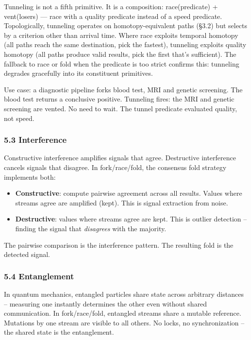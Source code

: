 \documentclass[
]{article}
\providecommand{\tightlist}{%
  \setlength{\itemsep}{0pt}\setlength{\parskip}{0pt}}
\begin{document}
Tunneling is not a fifth primitive. It is a composition: race(predicate)
+ vent(losers) --- race with a quality predicate instead of a speed
predicate. Topologically, tunneling operates on homotopy-equivalent
paths (§3.2) but selects by a criterion other than arrival time. Where
race exploits temporal homotopy (all paths reach the same destination,
pick the fastest), tunneling exploits quality homotopy (all paths
produce valid results, pick the first that's sufficient). The fallback
to race or fold when the predicate is too strict confirms this:
tunneling degrades gracefully into its constituent primitives.

Use case: a diagnostic pipeline forks blood test, MRI and genetic
screening. The blood test returns a conclusive positive. Tunneling
fires: the MRI and genetic screening are vented. No need to wait. The
tunnel predicate evaluated quality, not speed.

\subsubsection{\texorpdfstring{\textbf{5.3
Interference}}{5.3 Interference}}\label{interference}

Constructive interference amplifies signals that agree. Destructive
interference cancels signals that disagree. In fork/race/fold, the
consensus fold strategy implements both:

\begin{itemize}
\tightlist
\item
  \textbf{Constructive}: compute pairwise agreement across all results.
  Values where streams agree are amplified (kept). This is signal
  extraction from noise.\\
\item
  \textbf{Destructive}: values where streams agree are kept. This is
  outlier detection -- finding the signal that \emph{disagrees} with the
  majority.
\end{itemize}

The pairwise comparison is the interference pattern. The resulting fold
is the detected signal.

\subsubsection{\texorpdfstring{\textbf{5.4
Entanglement}}{5.4 Entanglement}}\label{entanglement}

In quantum mechanics, entangled particles share state across arbitrary
distances -- measuring one instantly determines the other even without
shared communication. In fork/race/fold, entangled streams share a
mutable reference. Mutations by one stream are visible to all others. No
locks, no synchronization -- the shared state is the entanglement.
\end{document}
